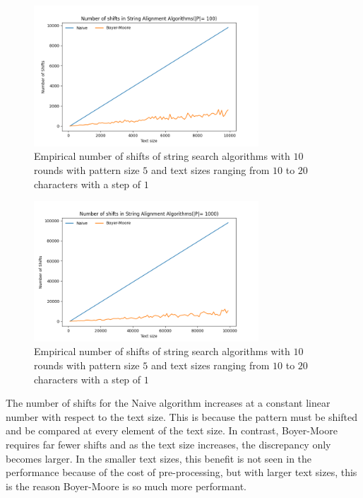 \documentclass[11pt, letterpaper]{article}
\begin{document}
\begin{figure}[H] \centering
    \includegraphics[width=0.75\textwidth]{shifts/r3.png}
    \caption{Empirical number of shifts of string search algorithms with $10$ rounds with pattern size $5$ and text sizes ranging from $10$ to $20$ characters with a step of $1$}
    \label{shiftsr3}
\end{figure}


\begin{figure}[H] \centering
    \includegraphics[width=0.75\textwidth]{shifts/r4.png}
    \caption{Empirical number of shifts of string search algorithms with $10$ rounds with pattern size $5$ and text sizes ranging from $10$ to $20$ characters with a step of $1$}
    \label{shiftsr4}
\end{figure}

The number of shifts for the Naive algorithm increases at a constant linear number with respect to the text size. This is because the pattern must be shifted and be compared at every element of the text size. In contrast, Boyer-Moore requires far fewer shifts and as the text size increases, the discrepancy only becomes larger. In the smaller text sizes, this benefit is not seen in the performance because of the cost of pre-processing, but with larger text sizes, this is the reason Boyer-Moore is so much more performant. 
\end{document}
